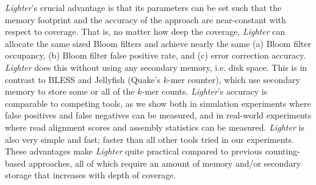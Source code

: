 \documentclass[10pt]{article}
\begin{document}
\emph{Lighter}'s crucial advantage is that its parameters can be set such that the memory footprint and the accuracy of the approach are near-constant with respect to coverage.
That is, no matter how deep the coverage, \emph{Lighter} can allocate the same sized Bloom filters and achieve nearly the same (a) Bloom filter occupancy, (b) Bloom filter false positive rate, and (c) error correction accuracy.
\emph{Lighter} does this without using any secondary memory, i.e. disk space.
This is in contrast to BLESS and Jellyfish (Quake's $k$-mer counter), which use secondary memory to store some or all of the $k$-mer counts.
\emph{Lighter}'s accuracy is comparable to competing tools, as we show both in simulation experiments where false positives and false negatives can be measured, and in real-world experiments where read alignment scores and assembly statistics can be measured.  
\emph{Lighter} is also very simple and fast; faster than all other tools tried in our experiments.
These advantages make \emph{Lighter} quite practical compared to previous counting-based approaches, all of which require an amount of memory and/or secondary storage that increases with depth of coverage.





\end{document}
